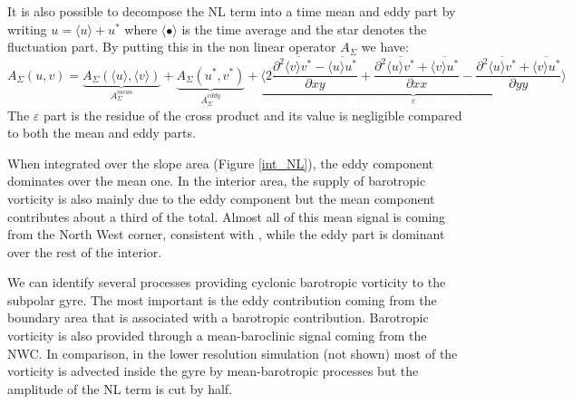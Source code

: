 \documentclass{ametsoc}
\begin{document}
It is also possible to decompose the NL term into a time mean and eddy part by writing $u = \langle u \rangle + u^*$ where $\langle \bullet\rangle$ is the time average and the star denotes the fluctuation part. By putting this in the non linear operator $A_{\Sigma}$ we have:
$$A_{\Sigma}(u,v)=\underbrace{A_{\Sigma}(\langle u \rangle, \langle v \rangle)}_{A_{\Sigma}^{mean}} + \underbrace{A_{\Sigma}(u^*,v^*)}_{A_{\Sigma}^{eddy}} +\underbrace{\langle  2\frac{\partial ^2 \overline{\langle v \rangle v^*} -\overline{\langle u \rangle u^*}}{\partial xy} +\frac{\partial ^2 \overline{\langle u \rangle v^*} + \overline{\langle v \rangle u^*}}{\partial xx} - \frac{\partial ^2 \overline{\langle u \rangle v^*} +\overline{ \langle v \rangle u^*}}{\partial yy}\rangle}_{\varepsilon}$$
The $\varepsilon$ part is the residue of the cross product and its value is negligible compared to both the mean and eddy parts. 

When integrated over the slope area (Figure \ref{int_NL}), the eddy component dominates over the mean one. In the interior area, the supply of barotropic vorticity is also mainly due to the eddy component but the mean component contributes about a third of the total. Almost all of this mean signal is coming from the North West corner, consistent with \citet{wang2017}, while the eddy part is dominant over the rest of the interior.  %


We can identify several processes providing cyclonic barotropic vorticity to the subpolar gyre. The most important is the eddy contribution coming from the boundary area that is associated with a barotropic contribution. Barotropic vorticity is also provided through a mean-baroclinic signal coming from the NWC. In comparison, in the lower resolution simulation (not shown) most of the vorticity is advected inside the gyre by mean-barotropic processes but the amplitude of the NL term is cut by half.
\end{document}
